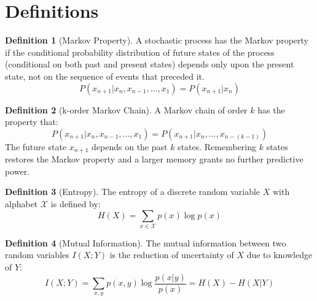 \documentclass{article} %
\title{}
\author{}
\theoremstyle{definition}
\newtheorem{definition}{Definition}[section]
\begin{document}
\maketitle

\begin{abstract}
We seek to contribute:\\
1) A formal defintion of Partial Observability\\
2) A formal measure of the degree to which a domain is partially observable\\
3) A way to quantify the deficiency of a given state representation\\
\end{abstract}

\section{Definitions}

\begin{definition}[Markov Property]
A stochastic process has the Markov property if the conditional
probability distribution of future states of the process (conditional
on both past and present states) depends only upon the present state,
not on the sequence of events that preceded it.
\[
P(x_{n+1} | x_{n}, x_{n-1}, \dots, x_{1}) = P(x_{n+1} | x_{n})
\]
\end{definition}

\begin{definition}[k-order Markov Chain]
A Markov chain of order $k$ has the property that:
\[
P(x_{n+1} | x_{n}, x_{n-1}, \dots, x_{1}) = P(x_{n+1} | x_{n}, \dots, x_{n-(k-1)})
\]
The future state $x_{n+1}$ depends on the past $k$ states. Remembering
$k$ states restores the Markov property and a larger memory grants no
further predictive power.
\end{definition}

\begin{definition}[Entropy]
\label{def:entropy}
The entropy of a discrete random variable $X$ with alphabet $\mathcal{X}$ is
defined by:
\[
H(X) = \sum_{x\in \mathcal{X}} p(x) \log p(x)
\]
\end{definition}

\begin{definition}[Mutual Information]
The mutual information between two random variables $I(X;Y)$ is the
reduction of uncertainty of $X$ due to knowledge of $Y$:
\[
I(X;Y) = \sum_{x,y} p(x,y) \log \frac{p(x|y)}{p(x)} = H(X) - H(X|Y)
\]
\end{definition}
\end{document}
